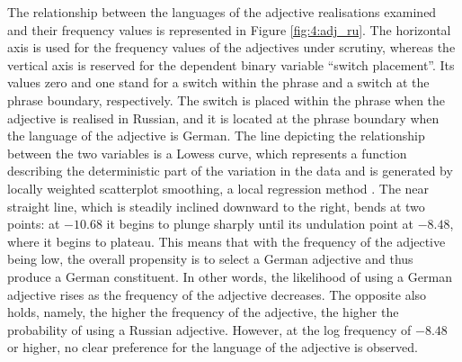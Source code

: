 The relationship between the languages of the  adjective realisations examined and their frequency values is represented in Figure \ref{fig:4:adj_ru}. The horizontal axis is used for the frequency values of the adjectives under scrutiny, whereas the vertical axis is reserved for the dependent binary variable “switch placement”. Its values zero and one stand for a switch within the phrase and a switch at the phrase boundary, respectively. The switch is placed within the phrase when the adjective is realised in Russian, and it is located at the phrase boundary when the language of the adjective is German. The line depicting the relationship between the two variables is a Lowess curve, which represents a function describing the deterministic part of the variation in the data and is generated by locally weighted scatterplot smoothing, a local regression method \citep{lowess}. The near straight line, which is steadily inclined downward to the right, bends at two points: at $-10.68$ it begins to plunge sharply until its undulation point at $-8.48$, where it begins to plateau. This means that with the frequency of the adjective being low, the overall propensity is to select a German adjective and thus produce a German constituent. In other words, the likelihood of using a German adjective rises as the frequency of the adjective decreases. The opposite also holds, namely, the higher the frequency of the adjective, the higher the probability of using a Russian adjective. However, at the log frequency of $-8.48$ or higher, no clear preference for the language of the adjective is observed.

